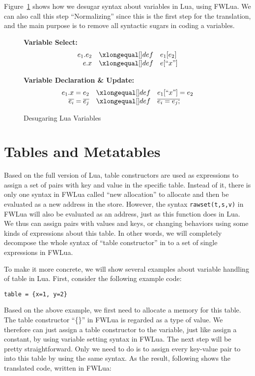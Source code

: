 Figure~\ref{fig:desLuaVar} shows how we desugar syntax about variables in Lua, using FWLua. We can also call this step ``Normalizing'' since this is the first step for the translation, and the main purpose is to remove all syntactic sugars in coding a variables.

\begin{figure}
\caption{Desugaring Lua Variables}\label{fig:desLuaVar}
{\bf Variable Select:}\[
\begin{array}{rclcl}

\desugar{e_1.e_2}{e_1[e_2]}
\desugar{e.x}{e[``x"]}

\end{array}\]

{\bf Variable Declaration \& Update:}\[
\begin{array}{rclcl}

\desugar{e_1.x=e_2}{e_1[``x"] = e_2}
\desugar{\overline{e_i}=\overline{e_j}}{\overline{e_i = e_j;}}
\end{array}\]
\end{figure}

\section{Tables and Metatables}\label{sec:TranslateTabls}
Based on the full version of Lua, table constructors are used as expressions to assign a set of pairs with key and value in the specific table. Instead of it, there is only one syntax in FWLua called ``new allocation'' to allocate and then be evaluated as a new address in the store. 
However, the syntax {\tt rawset(t,s,v)} in FWLua will also be evaluated as an address, just as this function does in Lua.  We thus can assign pairs with values and keys, or changing behaviors using some kinds of expressions about this table. In other words, we will completely decompose the whole syntax of ``table constructor'' in to a set of single expressions in FWLua. 

To make it more concrete, we will show several examples about variable handling of table in Lua. First, consider the following example code:

\begin{verbatim}
table = {x=1, y=2}
\end{verbatim}

Based on the above example, we first need to allocate a memory for this table. The table constructor ``\{\}'' in FWLua is regarded as a type of value. We therefore can just assign a table constructor to the variable, just like assign a constant, by using variable setting syntax in FWLua. The next step will be pretty straightforward. Only we need to do is to assign every key-value pair to into this table by using the same syntax. As the result, following shows the translated code, written in FWLua:

